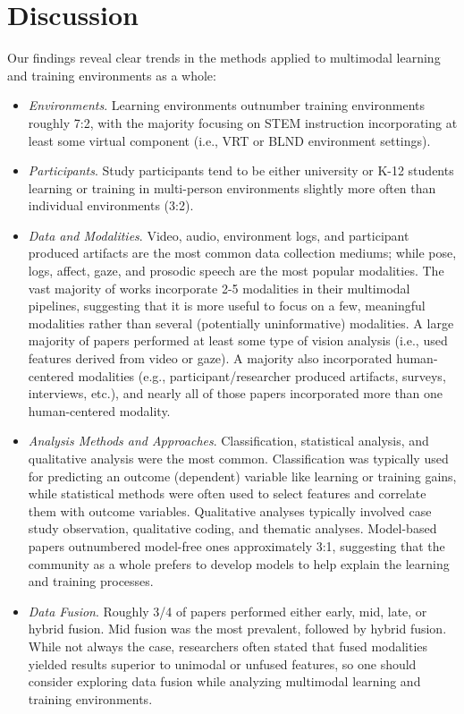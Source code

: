 \documentclass[manuscript,screen,review]{acmart}
\begin{document}
\section{Discussion} \label{sec:discussion}

Our findings reveal clear trends in the methods applied to multimodal learning and training environments as a whole:
\begin{itemize}
    \item \textit{Environments}. Learning environments outnumber training environments roughly 7:2, with the majority focusing on STEM instruction incorporating at least some virtual component (i.e., VRT or BLND environment settings).
    \item \textit{Participants}. Study participants tend to be either university or K-12 students learning or training in multi-person environments slightly more often than individual environments (3:2).
    \item \textit{Data and Modalities}. Video, audio, environment logs, and participant produced artifacts are the most common data collection mediums; while pose, logs, affect, gaze, and prosodic speech are the most popular modalities. The vast majority of works incorporate 2-5 modalities in their multimodal pipelines, suggesting that it is more useful to focus on a few, meaningful modalities rather than several (potentially uninformative) modalities. A large majority of papers performed at least some type of vision analysis (i.e., used features derived from video or gaze). A majority also incorporated human-centered modalities (e.g., participant/researcher produced artifacts, surveys, interviews, etc.), and nearly all of those papers incorporated more than one human-centered modality.
    \item \textit{Analysis Methods and Approaches}. Classification, statistical analysis, and qualitative analysis were the most common. Classification was typically used for predicting an outcome (dependent) variable like learning or training gains, while statistical methods were often used to select features and correlate them with outcome variables. Qualitative analyses typically involved case study observation, qualitative coding, and thematic analyses. Model-based papers outnumbered model-free ones approximately 3:1, suggesting that the community as a whole prefers to develop models to help explain the learning and training processes.
    \item \textit{Data Fusion}. Roughly 3/4 of papers performed either early, mid, late, or hybrid fusion. Mid fusion was the most prevalent, followed by hybrid fusion. While not always the case, researchers often stated that fused modalities yielded results superior to unimodal or unfused features, so one should consider exploring data fusion while analyzing multimodal learning and training environments. 

\end{itemize}
\end{document}
